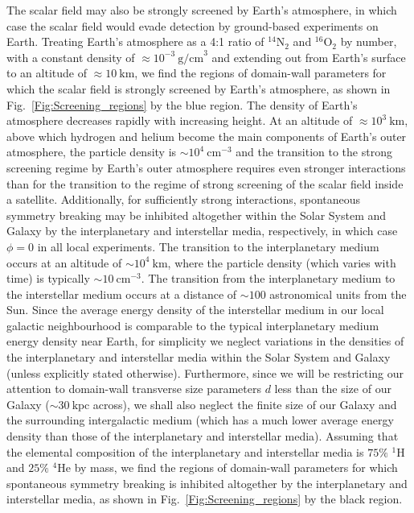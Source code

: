 \documentclass[aps,prd,onecolumn,nofootinbib]{revtex4-2} %
\begin{document}
The scalar field may also be strongly screened by Earth's atmosphere, in which case the scalar field would evade detection by ground-based experiments on Earth. 
Treating Earth's atmosphere as a 4:1 ratio of $^{14}\textrm{N}_2$ and $^{16}\textrm{O}_2$ by number, with a constant density of $\approx 10^{-3}~\textrm{g/cm}^3$ and extending out from Earth's surface to an altitude of $\approx 10~\textrm{km}$, 
we find the regions of domain-wall parameters for which the scalar field is strongly screened by Earth's atmosphere, as shown in Fig.~\ref{Fig:Screening_regions} by the blue region. 
The density of Earth's atmosphere decreases rapidly with increasing height. 
At an altitude of $\approx 10^3~\textrm{km}$, above which hydrogen and helium become the main components of Earth's outer atmosphere, the particle density is $\sim 10^4~\textrm{cm}^{-3}$ and the transition to the strong screening regime by Earth's outer atmosphere requires even stronger interactions than for the transition to the regime of strong screening of the scalar field inside a satellite. 
Additionally, for sufficiently strong interactions, spontaneous symmetry breaking may be inhibited altogether within the Solar System and Galaxy by the interplanetary and interstellar media, respectively, in which case $\phi = 0$ in all local experiments. 
The transition to the interplanetary medium occurs at an altitude of $\sim 10^4~\textrm{km}$, where the particle density (which varies with time) is typically $\sim 10~\textrm{cm}^{-3}$. 
The transition from the interplanetary medium to the interstellar medium occurs at a distance of $\sim 100$ astronomical units from the Sun. 
Since the average energy density of the interstellar medium in our local galactic neighbourhood is comparable to the typical interplanetary medium energy density near Earth, for simplicity we neglect variations in the densities of the interplanetary and interstellar media within the Solar System and Galaxy (unless explicitly stated otherwise). 
Furthermore, since we will be restricting our attention to domain-wall transverse size parameters $d$ less than the size of our Galaxy ($\sim 30~\textrm{kpc}$ across), we shall also neglect the finite size of our Galaxy and the surrounding intergalactic medium (which has a much lower average energy density than those of the interplanetary and interstellar media). 
Assuming that the elemental composition of the interplanetary and interstellar media is $75\%$ $^{1}$H and $25\%$ $^{4}$He by mass, we find the regions of domain-wall parameters for which spontaneous symmetry breaking is inhibited altogether by the interplanetary and interstellar media, as shown in Fig.~\ref{Fig:Screening_regions} by the black region. 
\end{document}
